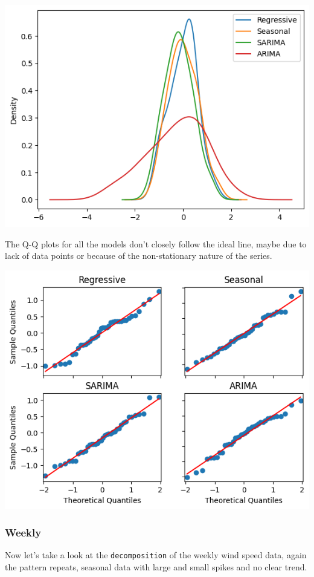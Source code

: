 \documentclass[a4paper,12pt]{article}
\begin{document}
\begin{center}
\includegraphics[width=0.8\linewidth]{./images/tiru/monthlyDist.png}
\end{center}

The Q-Q plots for all the models don't closely follow the ideal line, maybe due to lack of data points or because of the non-stationary nature of the series.

\begin{center}
\includegraphics[width=0.8\linewidth]{./images/tiru/monthlyQQ.png}
\end{center}
\pagebreak

\subsubsection{Weekly}
\label{sec:org76b144b}
Now let's take a look at the \texttt{decomposition} of the weekly wind speed data, again the pattern repeats, seasonal data with large and small spikes and no clear trend.
\end{document}
